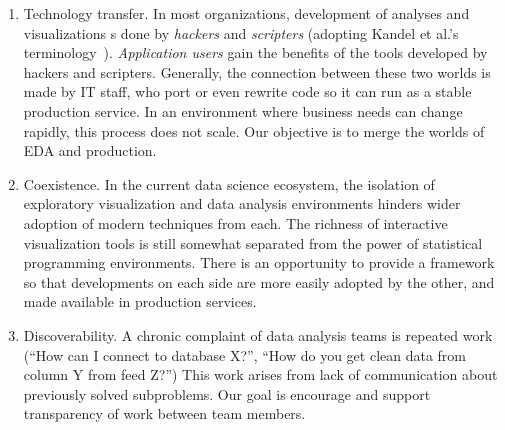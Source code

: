 \begin{enumerate}

\item Technology transfer.
In most organizations, development of analyses and visualizations 
s done by \emph{hackers} and \emph{scripters} (adopting Kandel et al.'s
terminology~\cite{Kandel:2012:EDA}). \emph{Application users} 
gain the benefits of the tools developed by hackers and scripters.
Generally, the connection between these two worlds is made by IT staff,
who port or even rewrite code so it can run as a stable production service.
In an environment where business needs can change rapidly, this
process does not scale. Our objective is to merge the worlds
of EDA and production.

\item Coexistence. In the current data science ecosystem, the
isolation of exploratory visualization and data analysis
environments hinders wider adoption of modern techniques from each.
The richness of interactive visualization tools is still somewhat
separated from the power of statistical programming environments.
There is an opportunity to provide a framework so that developments
on each side are more easily adopted by the other, and made available
in production services.

\item Discoverability. A chronic complaint of data analysis teams is
repeated work (``How can I connect to database X?'', ``How do you get
clean data from column Y from feed Z?'') This work arises from lack of
communication about previously solved subproblems. Our goal is encourage
and support transparency of work between team members.

\end{enumerate}
